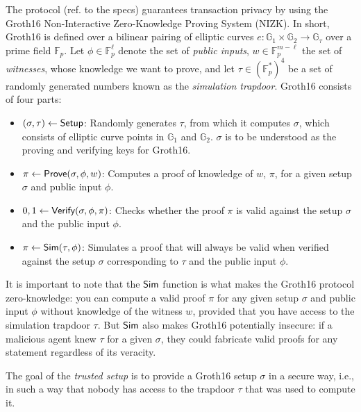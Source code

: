 
The \MantaPay{} protocol (ref. to the specs) guarantees transaction privacy by using the Groth16 \cite{groth16} Non-Interactive Zero-Knowledge Proving System (NIZK). In short, Groth16 is defined over a bilinear pairing of elliptic curves $e: \mathbb{G}_1 \times \mathbb{G}_2 \rightarrow \mathbb{G}_\tau$ over a prime field $\mathbb{F}_p$. Let $\phi \in \mathbb{F}_p^\ell$ denote the set of \emph{public inputs}, $w \in \mathbb{F}_p^{m-\ell}$ the set of \emph{witnesses}, whose knowledge we want to prove, and let $\tau \in (\mathbb{F}_p^{*})^4$ be a set of randomly generated numbers known as the \emph{simulation trapdoor}. Groth16 consists of four parts:
\begin{itemize}
\item $(\sigma, \tau) \leftarrow {\textsf{Setup}}$: Randomly generates $\tau$, from which it computes $\sigma$, which consists of elliptic curve points in $\mathbb{G}_1$ and $\mathbb{G}_2$. $\sigma$ is to be understood as the proving and verifying keys for Groth16.
\item $\pi \leftarrow {\textsf{Prove}}(\sigma, \phi, w)$: Computes a proof of knowledge of $w$, $\pi$, for a given setup $\sigma$ and public input $\phi$.
\item $0, 1 \leftarrow {\textsf{Verify}}(\sigma, \phi, \pi)$: Checks whether the proof $\pi$ is valid against the setup $\sigma$ and the public input $\phi$.
\item $\pi \leftarrow {\textsf{Sim}}(\tau, \phi)$: Simulates a proof that will always be valid when verified against the setup $\sigma$ corresponding to $\tau$ and the public input $\phi$.
\end{itemize}

It is important to note that the ${\textsf{Sim}}$ function is what makes the Groth16 protocol zero-knowledge: you can compute a valid proof $\pi$ for any given setup $\sigma$ and public input $\phi$ without knowledge of the witness $w$, provided that you have access to the simulation trapdoor $\tau$. But ${\textsf{Sim}}$ also makes Groth16 potentially insecure: if a malicious agent knew $\tau$ for a given $\sigma$, they could fabricate valid proofs for any statement regardless of its veracity. 

The goal of the \emph{trusted setup} is to provide a Groth16 setup $\sigma$ in a secure way, i.e., in such a way that nobody has access to the trapdoor $\tau$ that was used to compute it.
